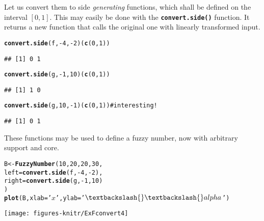 \documentclass[11pt]{article}\usepackage{graphicx, color}
\makeatletter
\newcommand{\hlfunctioncall}[1]{\textcolor[rgb]{0.501960784313725,0,0.329411764705882}{\textbf{#1}}}%
\newcommand{\hlstring}[1]{\textcolor[rgb]{0.6,0.6,1}{#1}}%
\newcommand{\hlcomment}[1]{\textcolor[rgb]{0.180392156862745,0.6,0.341176470588235}{#1}}%
\newenvironment{kframe}{%
 \def\at@end@of@kframe{}%
 \ifinner\ifhmode%
  \def\at@end@of@kframe{\end{minipage}}%
  \begin{minipage}{\columnwidth}%
 \fi\fi%
 \def\FrameCommand##1{\hskip\@totalleftmargin \hskip-\fboxsep
 \colorbox{shadecolor}{##1}\hskip-\fboxsep
     \hskip-\linewidth \hskip-\@totalleftmargin \hskip\columnwidth}%
 \MakeFramed {\advance\hsize-\width
   \@totalleftmargin\z@ \linewidth\hsize
   \@setminipage}}%
 {\par\unskip\endMakeFramed%
 \at@end@of@kframe}
\newenvironment{knitrout}{}{} %
\newcommand{\func}[1]{\texttt{\hlfunctioncall{#1}}}
\makeatother
\begin{document}
Let us convert them to side \textit{generating} functions, which shall be
defined on the interval $[0,1]$.
This may easily be done with the \func{convert.side()}
function. It returns a new function that calls
the original one with linearly transformed input.

\begin{knitrout}\small
{}\color{fgcolor}\begin{kframe}
\begin{alltt}
\hlfunctioncall{convert.side}(f, -4, -2)(\hlfunctioncall{c}(0,1))
\end{alltt}
\begin{verbatim}
## [1] 0 1
\end{verbatim}
\begin{alltt}
\hlfunctioncall{convert.side}(g, -1, 10)(\hlfunctioncall{c}(0,1))
\end{alltt}
\begin{verbatim}
## [1] 1 0
\end{verbatim}
\begin{alltt}
\hlfunctioncall{convert.side}(g, 10, -1)(\hlfunctioncall{c}(0,1)) \hlcomment{# interesting!}
\end{alltt}
\begin{verbatim}
## [1] 0 1
\end{verbatim}
\end{kframe}
\end{knitrout}


\noindent
These functions may be used to define a fuzzy number,
now with arbitrary support and core.

\begin{knitrout}\small
{}\color{fgcolor}\begin{kframe}
\begin{alltt}
B <- \hlfunctioncall{FuzzyNumber}(10,20,20,30,
    left=\hlfunctioncall{convert.side}(f, -4, -2),
   right=\hlfunctioncall{convert.side}(g, -1, 10)
)
\hlfunctioncall{plot}(B, xlab=\hlstring{'$x$'}, ylab=\hlstring{'$\textbackslash{}\textbackslash{}alpha$'})
\end{alltt}
\end{kframe}
\end{knitrout}


\begin{center}
\begin{knitrout}\small
{}\color{fgcolor}

{\centering \texttt{[image: figures-knitr/ExFconvert4]} 

}



\end{knitrout}

\end{center}
\end{document}
